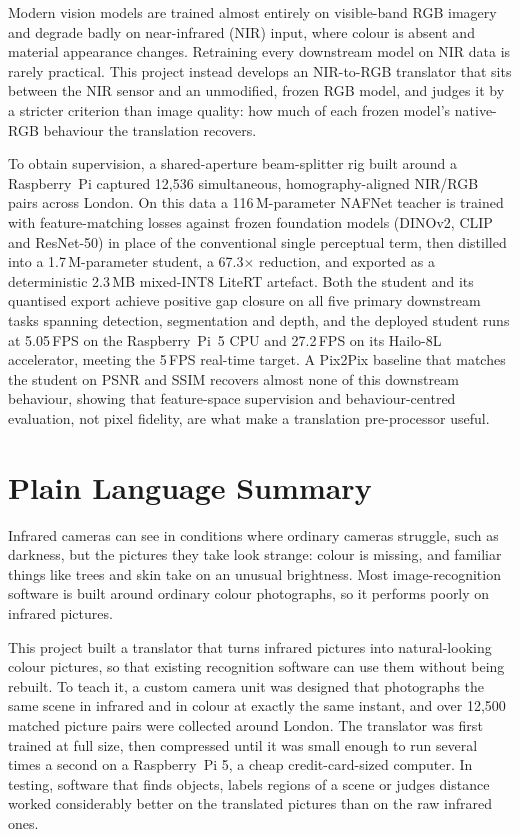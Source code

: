 Modern vision models are trained almost entirely on visible-band RGB imagery and degrade badly on near-infrared (NIR) input, where colour is absent and material appearance changes. Retraining every downstream model on NIR data is rarely practical. This project instead develops an NIR-to-RGB translator that sits between the NIR sensor and an unmodified, frozen RGB model, and judges it by a stricter criterion than image quality: how much of each frozen model's native-RGB behaviour the translation recovers.

To obtain supervision, a shared-aperture beam-splitter rig built around a Raspberry~Pi captured 12{,}536 simultaneous, homography-aligned NIR/RGB pairs across London. On this data a 116\,M-parameter NAFNet teacher is trained with feature-matching losses against frozen foundation models (DINOv2, CLIP and ResNet-50) in place of the conventional single perceptual term, then distilled into a 1.7\,M-parameter student, a 67.3$\times$ reduction, and exported as a deterministic 2.3\,MB mixed-INT8 LiteRT artefact. Both the student and its quantised export achieve positive gap closure on all five primary downstream tasks spanning detection, segmentation and depth, and the deployed student runs at 5.05\,FPS on the Raspberry~Pi~5 CPU and 27.2\,FPS on its Hailo-8L accelerator, meeting the 5\,FPS real-time target. A Pix2Pix baseline that matches the student on PSNR and SSIM recovers almost none of this downstream behaviour, showing that feature-space supervision and behaviour-centred evaluation, not pixel fidelity, are what make a translation pre-processor useful.




\cleardoublepage{}

\mtcaddchapter 
\chapter*{Plain Language Summary}
\addtocounter{counter}{-1}

Infrared cameras can see in conditions where ordinary cameras struggle, such as darkness, but the pictures they take look strange: colour is missing, and familiar things like trees and skin take on an unusual brightness. Most image-recognition software is built around ordinary colour photographs, so it performs poorly on infrared pictures.

This project built a translator that turns infrared pictures into natural-looking colour pictures, so that existing recognition software can use them without being rebuilt. To teach it, a custom camera unit was designed that photographs the same scene in infrared and in colour at exactly the same instant, and over 12{,}500 matched picture pairs were collected around London. The translator was first trained at full size, then compressed until it was small enough to run several times a second on a Raspberry~Pi 5, a cheap credit-card-sized computer. In testing, software that finds objects, labels regions of a scene or judges distance worked considerably better on the translated pictures than on the raw infrared ones.
